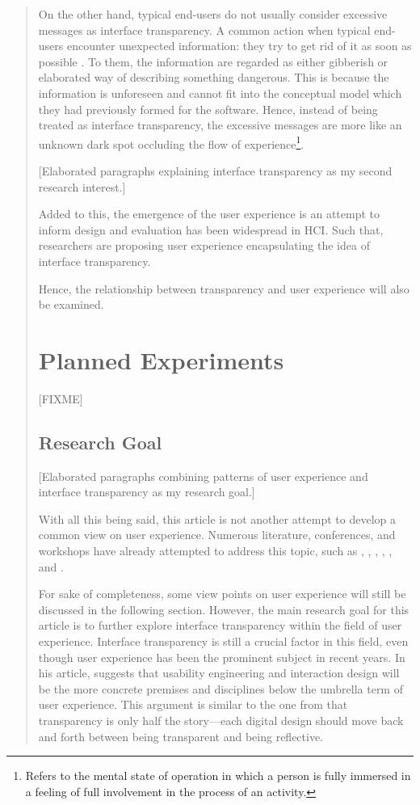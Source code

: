 \documentclass[a4paper,titlepage]{article}
\begin{document}
\begin{quote}
On the other hand, typical end-users do not usually consider excessive
messages as interface transparency. A common action when typical
end-users encounter unexpected information: they try to get rid of it
as soon as possible \citep{oldnew:chen}. To them, the information are
regarded as either gibberish or elaborated way of describing something
dangerous. This is because the information is unforeseen and cannot
fit into the conceptual model which they had previously formed for the
software. Hence, instead of being treated as interface transparency,
the excessive messages are more like an unknown dark spot occluding
the flow of experience\footnote{Refers to the mental state of
  operation in which a person is fully immersed in a feeling of full
  involvement in the process of an activity.}.


[Elaborated paragraphs explaining interface transparency as my second
  research interest.]

Added to this, the emergence of the user experience is an attempt to
inform design and evaluation has been widespread in HCI. Such that,
researchers are proposing user experience encapsulating the idea of
interface transparency.

Hence, the relationship between transparency and user
experience will also be examined.


\section{Planned Experiments}
\label{sec:experiment}
[FIXME]

\subsection{Research Goal}
[Elaborated paragraphs combining patterns of user experience and
  interface transparency as my research goal.]

With all this being said, this article is not another attempt to
develop a common view on user experience. Numerous literature,
conferences, and workshops have already attempted to address this
topic, such as \citet{early:forlizzi}, \citet{emotional:norman},
\citet{action:dourish}, \citet{ux:hassenzahl},
\citet{experience:desmet}, and \citet{ux:law}.

For sake of completeness, some view points on user experience will
still be discussed in the following section. However, the main
research goal for this article is to further explore interface
transparency within the field of user experience. Interface
transparency is still a crucial factor in this field, even though user
experience has been the prominent subject in recent years. In his
article, \citet{future:memmel} suggests that usability engineering and
interaction design will be the more concrete premises and disciplines
below the umbrella term of user experience. This argument is similar
to the one from \citet{windows:bolter} that transparency is only half
the story---each digital design should move back and forth between
being transparent and being reflective.


\end{quote}
\end{document}
